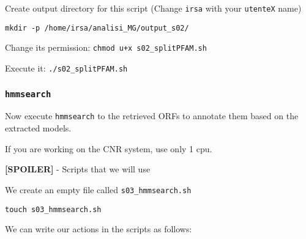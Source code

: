 \documentclass[
]{book}
\newenvironment{Shaded}{\begin{snugshade}}{\end{snugshade}}
\newcommand{\AttributeTok}[1]{\textcolor[rgb]{0.13,0.29,0.53}{#1}}
\newcommand{\BuiltInTok}[1]{#1}
\newcommand{\CommentTok}[1]{\textcolor[rgb]{0.56,0.35,0.01}{\textit{#1}}}
\newcommand{\ControlFlowTok}[1]{\textcolor[rgb]{0.13,0.29,0.53}{\textbf{#1}}}
\newcommand{\ExtensionTok}[1]{#1}
\newcommand{\FunctionTok}[1]{\textcolor[rgb]{0.13,0.29,0.53}{\textbf{#1}}}
\newcommand{\KeywordTok}[1]{\textcolor[rgb]{0.13,0.29,0.53}{\textbf{#1}}}
\newcommand{\NormalTok}[1]{#1}
\newcommand{\OperatorTok}[1]{\textcolor[rgb]{0.81,0.36,0.00}{\textbf{#1}}}
\newcommand{\StringTok}[1]{\textcolor[rgb]{0.31,0.60,0.02}{#1}}
\newcommand{\VariableTok}[1]{\textcolor[rgb]{0.00,0.00,0.00}{#1}}
\begin{document}
Create output directory for this script (Change \texttt{irsa} with your \texttt{utenteX} name)

\begin{verbatim}
mkdir -p /home/irsa/analisi_MG/output_s02/
\end{verbatim}

Change its permission:
\texttt{chmod\ u+x\ s02\_splitPFAM.sh}

Execute it:
\texttt{./s02\_splitPFAM.sh}

\subsubsection{\texorpdfstring{\texttt{hmmsearch}}{hmmsearch}}\label{hmmsearch}

Now execute \texttt{hmmsearch} to the retrieved ORFs to annotate them based on the extracted models.

If you are working on the CNR system, use only 1 cpu.

\textbf{{[}SPOILER{]}} - Scripts that we will use

We create an empty file called \texttt{s03\_hmmsearch.sh}

\texttt{touch\ s03\_hmmsearch.sh}

We can write our actions in the scripts as follows:

\begin{Shaded}
\end{Shaded}
\end{document}
